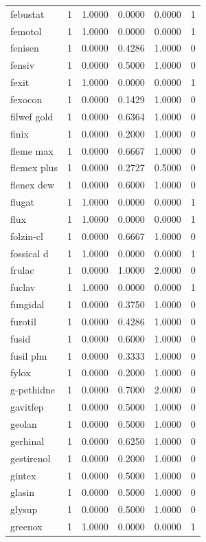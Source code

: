 \begin{longtable}{p{3.0cm}rrrrr}
febustat & 1 & 1.0000 & 0.0000 & 0.0000 & 1 \\
femotol & 1 & 1.0000 & 0.0000 & 0.0000 & 1 \\
fenisen & 1 & 0.0000 & 0.4286 & 1.0000 & 0 \\
fensiv & 1 & 0.0000 & 0.5000 & 1.0000 & 0 \\
fexit & 1 & 1.0000 & 0.0000 & 0.0000 & 1 \\
fexocon & 1 & 0.0000 & 0.1429 & 1.0000 & 0 \\
filwef gold & 1 & 0.0000 & 0.6364 & 1.0000 & 0 \\
finix & 1 & 0.0000 & 0.2000 & 1.0000 & 0 \\
fleme max & 1 & 0.0000 & 0.6667 & 1.0000 & 0 \\
flemex plus & 1 & 0.0000 & 0.2727 & 0.5000 & 0 \\
flenex dew & 1 & 0.0000 & 0.6000 & 1.0000 & 0 \\
flugat & 1 & 1.0000 & 0.0000 & 0.0000 & 1 \\
flux & 1 & 1.0000 & 0.0000 & 0.0000 & 1 \\
folzin-cl & 1 & 0.0000 & 0.6667 & 1.0000 & 0 \\
fossical d & 1 & 1.0000 & 0.0000 & 0.0000 & 1 \\
frulac & 1 & 0.0000 & 1.0000 & 2.0000 & 0 \\
fuclav & 1 & 1.0000 & 0.0000 & 0.0000 & 1 \\
fungidal & 1 & 0.0000 & 0.3750 & 1.0000 & 0 \\
furotil & 1 & 0.0000 & 0.4286 & 1.0000 & 0 \\
fusid & 1 & 0.0000 & 0.6000 & 1.0000 & 0 \\
fusil plm & 1 & 0.0000 & 0.3333 & 1.0000 & 0 \\
fylox & 1 & 0.0000 & 0.2000 & 1.0000 & 0 \\
g-pethidne & 1 & 0.0000 & 0.7000 & 2.0000 & 0 \\
gavitfep & 1 & 0.0000 & 0.5000 & 1.0000 & 0 \\
geolan & 1 & 0.0000 & 0.5000 & 1.0000 & 0 \\
gerhinal & 1 & 0.0000 & 0.6250 & 1.0000 & 0 \\
gestirenol & 1 & 0.0000 & 0.2000 & 1.0000 & 0 \\
gintex & 1 & 0.0000 & 0.5000 & 1.0000 & 0 \\
glasin & 1 & 0.0000 & 0.5000 & 1.0000 & 0 \\
glysup & 1 & 0.0000 & 0.5000 & 1.0000 & 0 \\
greenox & 1 & 1.0000 & 0.0000 & 0.0000 & 1 \\

\end{longtable}
